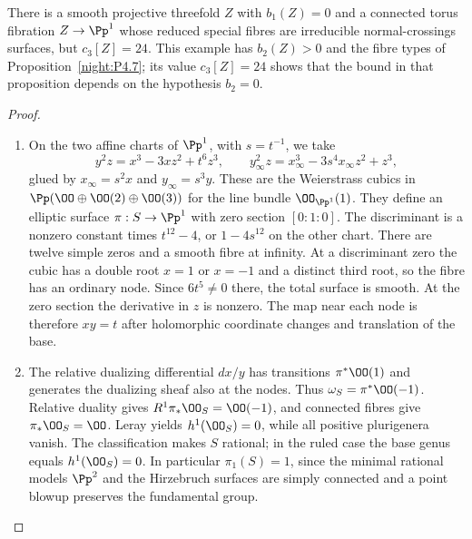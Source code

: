 \begin{proposition}\hypertarget{tag-02WH}{}\label{night:P4.10}\label{stmt:P4.10}

There is a smooth projective threefold $Z$ with $b_1(Z)=0$ and a
connected torus fibration $Z\to\Pp^1$ whose reduced special fibres
are irreducible normal-crossings surfaces, but $c_3[Z]=24$.
This example has $b_2(Z)>0$ and the fibre types of
Proposition~\ref{night:P4.7}; its value $c_3[Z]=24$ shows that the
bound in that proposition depends on the hypothesis $b_2=0$.
\end{proposition}
\begin{proof}

\begin{enumerate}[label={$\langle1\rangle$\arabic*.},leftmargin=*]
\item On the two affine charts of $\Pp^1$, with $s=t^{-1}$, we take
\[
 y^2z=x^3-3xz^2+t^6z^3,\qquad
 y_\infty^2z=x_\infty^3-3s^4x_\infty z^2+z^3,
\]
glued by $x_\infty=s^2x$ and $y_\infty=s^3y$. These are the
Weierstrass cubics in $\Pp(\OO\oplus\OO(2)\oplus\OO(3))$ for
the line bundle $\OO_{\Pp^1}(1)$. They define an elliptic surface
$\pi:S\to\Pp^1$ with zero section $[0:1:0]$. The discriminant
is a nonzero constant times $t^{12}-4$, or $1-4s^{12}$ on the
other chart. There are twelve simple zeros and a smooth fibre at
infinity. At a discriminant zero the cubic has a double root
$x=1$ or $x=-1$ and a distinct third root, so the fibre has an
ordinary node. Since $6t^5\ne0$ there, the total surface is smooth.
At the zero section the derivative in $z$ is nonzero. The map near
each node is therefore $xy=t$ after holomorphic coordinate changes
and translation of the base.

\item The relative dualizing differential $dx/y$ has transitions
$\pi^*\OO(1)$ and generates the dualizing sheaf also at the nodes.
Thus $\omega_S=\pi^*\OO(-1)$. Relative duality gives
$R^1\pi_*\OO_S=\OO(-1)$, and connected fibres give
$\pi_*\OO_S=\OO$. Leray yields $h^1(\OO_S)=0$, while all
positive plurigenera vanish. The classification \cite[Chapter~VI, Theorem~1.1, p.~243]{BHPV2004E} makes $S$
rational; in the ruled case the base genus equals $h^1(\OO_S)=0$.
In particular $\pi_1(S)=1$, since the minimal rational models
$\Pp^2$ and the Hirzebruch surfaces are simply connected and a
point blowup preserves the fundamental group.


\end{enumerate}
\end{proof}
